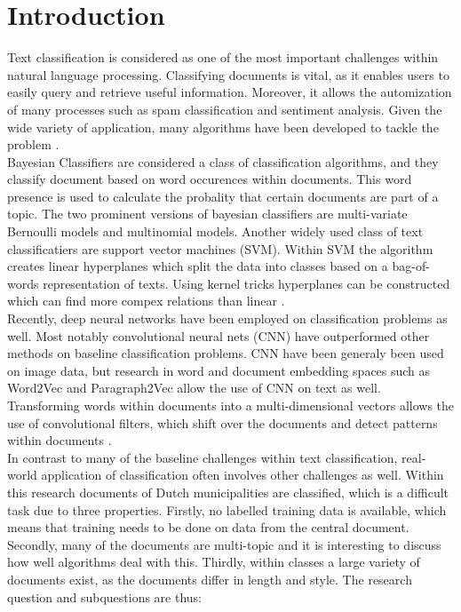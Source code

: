 \section{Introduction}
\label{sec:intro}
Text classification is considered as one of the most important challenges within natural language processing. Classifying documents is vital, as it enables users to easily query and retrieve useful information. Moreover, it allows the automization of many processes such as spam classification and sentiment analysis. Given the wide variety of application, many algorithms have been developed to tackle the problem \cite{aggarwal2012survey}.\\
Bayesian Classifiers are considered a class of classification algorithms, and they classify document based on word occurences within documents. This word presence is used to calculate the probality that certain documents are part of a topic. The two prominent versions of bayesian classifiers are multi-variate Bernoulli models and multinomial models. Another widely used class of text classificatiers are support vector machines (SVM). Within SVM the algorithm creates linear hyperplanes which split the data into classes based on a bag-of-words representation of texts. Using kernel tricks hyperplanes can be constructed which can find more compex relations than linear  \cite{aggarwal2012survey}.\\
Recently, deep neural networks have been employed on classification problems as well. Most notably convolutional neural nets (CNN) have outperformed other methods on baseline classification problems. CNN have been generaly been used on image data, but research in word and document embedding spaces such as Word2Vec \cite{mikolov2013efficient} and Paragraph2Vec \cite{le2014distributed} allow the use of CNN on text as well. Transforming words within documents into a multi-dimensional vectors allows the use of convolutional filters, which shift over the documents and detect patterns within documents \cite{kim2014convolutional}.\\
In contrast to many of the baseline challenges within text classification, real-world application of classification often involves other challenges as well. Within this research documents of Dutch municipalities are classified, which is a difficult task due to three properties. Firstly, no labelled training data is available, which means that training needs to be done on data from the central document. Secondly, many of the documents are multi-topic and it is interesting to discuss how well algorithms deal with this. Thirdly, within classes a large variety of documents exist, as the documents differ in length and style. The research question and subquestions are thus:\\

